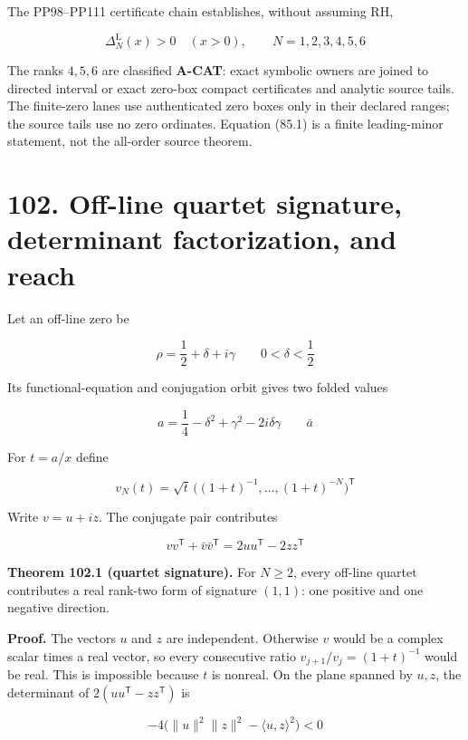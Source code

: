 \documentclass[
  11pt,
]{book}
\renewenvironment{quote}
  {\begin{tcolorbox}[
      enhanced,
      breakable,
      colback=tncream,
      colframe=tnrust,
      boxrule=0.8pt,
      arc=1.5pt,
      left=7pt,
      right=7pt,
      top=6pt,
      bottom=6pt]}
  {\end{tcolorbox}}
\begin{document}
The PP98--PP111 certificate chain establishes, without assuming RH,

\[
\boxed{\Delta_N^{\mathrm L}(x)>0
\quad(x>0),\qquad N=1,2,3,4,5,6}
\tag{85.1}
\]

The ranks \(4,5,6\) are classified \textbf{A-CAT}: exact symbolic owners
are joined to directed interval or exact zero-box compact certificates
and analytic source tails. The finite-zero lanes use authenticated zero
boxes only in their declared ranges; the source tails use no zero
ordinates. Equation (85.1) is a finite leading-minor statement, not the
all-order source theorem.

\section{102. Off-line quartet signature, determinant factorization, and
reach}\label{off-line-quartet-signature-determinant-factorization-and-reach}

Let an off-line zero be

\[
\rho=\frac12+\delta+i\gamma
\qquad 0<\delta<\frac12
\]

Its functional-equation and conjugation orbit gives two folded values

\[
a=\frac14-\delta^2+\gamma^2-2i\delta\gamma
\qquad \bar a
\tag{102.1}
\]

For \(t=a/x\) define

\[
v_N(t)=\sqrt t\,
\bigl((1+t)^{-1},\ldots,(1+t)^{-N}\bigr)^{\mathsf T}
\tag{102.2}
\]

Write \(v=u+iz\). The conjugate pair contributes

\[
v v^{\mathsf T}+\bar v\bar v^{\mathsf T}
=2uu^{\mathsf T}-2zz^{\mathsf T}
\tag{102.3}
\]

\begin{quote}
\textbf{Theorem 102.1 (quartet signature).} For \(N\ge2\), every
off-line quartet contributes a real rank-two form of signature
\((1,1)\): one positive and one negative direction.
\end{quote}

\textbf{Proof.} The vectors \(u\) and \(z\) are independent. Otherwise
\(v\) would be a complex scalar times a real vector, so every
consecutive ratio \(v_{j+1}/v_j=(1+t)^{-1}\) would be real. This is
impossible because \(t\) is nonreal. On the plane spanned by \(u,z\),
the determinant of \(2(uu^{\mathsf T}-zz^{\mathsf T})\) is

\[
-4\bigl(\|u\|^2\|z\|^2-\langle u,z\rangle^2\bigr)<0
\]
\end{document}
